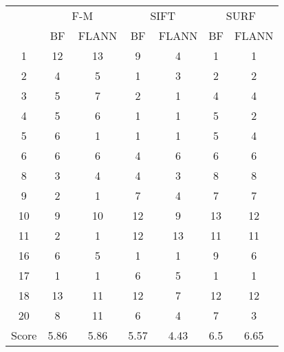 \documentclass[draft,final]{vutinfth} %
\begin{document}
\begin{appendices}
\begin{minipage}{\linewidth}
\centering
\begin{tabular}{c|cc|cc|cc}
& \multicolumn{2}{c}{ F-M } & \multicolumn{2}{c}{ SIFT } & \multicolumn{2}{c}{ SURF } \\
& BF & FLANN & BF & FLANN & BF & FLANN \\
\hline
1 & 12 & 13 & 9 & 4 & 1 & 1 \\
2 & 4 & 5 & 1 & 3 & 2 & 2 \\
3 & 5 & 7 & 2 & 1 & 4 & 4 \\
4 & 5 & 6 & 1 & 1 & 5 & 2 \\
5 & 6 & 1 & 1 & 1 & 5 & 4 \\
6 & 6 & 6 & 4 & 6 & 6 & 6 \\
8 & 3 & 4 & 4 & 3 & 8 & 8 \\
9 & 2 & 1 & 7 & 4 & 7 & 7 \\
10 & 9 & 10 & 12 & 9 & 13 & 12 \\
11 & 2 & 1 & 12 & 13 & 11 & 11 \\
16 & 6 & 5 & 1 & 1 & 9 & 6 \\
17 & 1 & 1 & 6 & 5 & 1 & 1 \\
18 & 13 & 11 & 12 & 7 & 12 & 12 \\
20 & 8 & 11 & 6 & 4 & 7 & 3 \\
\hline
Score & 5.86 & 5.86 & 5.57 & 4.43 & 6.5 & 6.65 \\
\end{tabular}
 \label{tab:BL} 
\end{minipage}



\end{appendices}
\end{document}
